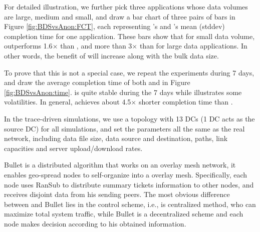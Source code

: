 For detailed illustration, we further pick three applications whose data volumes are large, medium and small, and draw a bar chart of three pairs of bars in Figure \ref{fig:BDSvsAnon:FCT}, each representing \name's and \company's mean (stddev) completion time for one application. These bars show that for small data volume, \name outperforms 1.6$\times$ than \company, and more than 3$\times$ than \company for large data applications. In other words, the benefit of \name will increase along with the bulk data size.

To prove that this is not a special case, we repeat the experiments during 7 days, and draw the average completion time of both \name and \company in Figure \ref{fig:BDSvsAnon:time}. \name is quite stable during the 7 days while \company illustrates some volatilities. In general, \name achieves about 4.5$\times$ shorter completion time than \company.



In the trace-driven simulations, we use a topology with 13 DCs (1 DC acts as the source DC) for all simulations, and set the parameters all the same as the real network, including data file size, data source and destination, paths, link capacities and server upload/download rates.

Bullet \cite{kostic2003bullet} is a distributed algorithm that works on an overlay mesh network, it enables geo-spread nodes to self-organize into a overlay mesh. Specifically, each node uses RanSub \cite{Rodriguez2003Using} to distribute summary tickets information to other nodes, and receives disjoint data from his sending peers. The most obvious difference between \name and Bullet lies in the control scheme, i.e., \name is centralized method, who can maximize total system traffic, while Bullet is a decentralized scheme and each node makes decision according to his obtained information.


